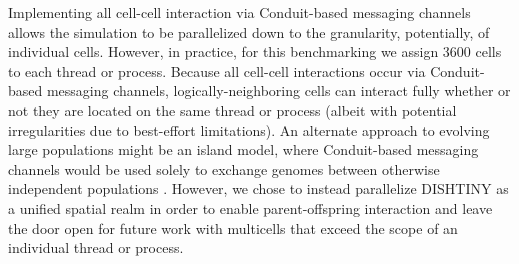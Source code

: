 Implementing all cell-cell interaction via Conduit-based messaging channels allows the simulation to be parallelized down to the granularity, potentially, of individual cells.
However, in practice, for this benchmarking we assign 3600 cells to each thread or process.
Because all cell-cell interactions occur via Conduit-based messaging channels, logically-neighboring cells can interact fully whether or not they are located on the same thread or process (albeit with potential irregularities due to best-effort limitations).
An alternate approach to evolving large populations might be an island model, where Conduit-based messaging channels would be used solely to exchange genomes between otherwise independent populations \cite{bennett1999building}.
However, we chose to instead parallelize DISHTINY as a unified spatial realm in order to enable parent-offspring interaction and leave the door open for future work with multicells that exceed the scope of an individual thread or process.
